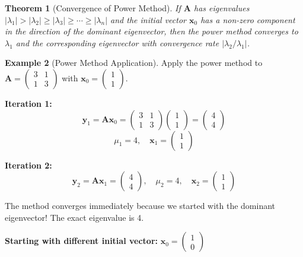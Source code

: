 \documentclass[12pt]{article}
\numberwithin{equation}{section}
\newcommand{\vect}[1]{\boldsymbol{#1}}   %
\newcommand{\mat}[1]{\mathbf{#1}}        %
\theoremstyle{plain}
\newtheorem{theorem}{Theorem}[section]
\theoremstyle{definition}
\newtheorem{example}[theorem]{Example}
\theoremstyle{remark}
\begin{document}
\begin{theorem}[Convergence of Power Method]
If $\mat{A}$ has eigenvalues $|\lambda_1| > |\lambda_2| \geq |\lambda_3| \geq \cdots \geq |\lambda_n|$ and the initial vector $\vect{x}_0$ has a non-zero component in the direction of the dominant eigenvector, then the power method converges to $\lambda_1$ and the corresponding eigenvector with convergence rate $|\lambda_2/\lambda_1|$.
\end{theorem}

\begin{example}[Power Method Application]
Apply the power method to $\mat{A} = \begin{pmatrix} 3 & 1 \\ 1 & 3 \end{pmatrix}$ with $\vect{x}_0 = \begin{pmatrix} 1 \\ 1 \end{pmatrix}$.

\textbf{Iteration 1:}
$$\vect{y}_1 = \mat{A}\vect{x}_0 = \begin{pmatrix} 3 & 1 \\ 1 & 3 \end{pmatrix}\begin{pmatrix} 1 \\ 1 \end{pmatrix} = \begin{pmatrix} 4 \\ 4 \end{pmatrix}$$
$$\mu_1 = 4, \quad \vect{x}_1 = \begin{pmatrix} 1 \\ 1 \end{pmatrix}$$

\textbf{Iteration 2:}
$$\vect{y}_2 = \mat{A}\vect{x}_1 = \begin{pmatrix} 4 \\ 4 \end{pmatrix}, \quad \mu_2 = 4, \quad \vect{x}_2 = \begin{pmatrix} 1 \\ 1 \end{pmatrix}$$

The method converges immediately because we started with the dominant eigenvector! The exact eigenvalue is 4.

\textbf{Starting with different initial vector:} $\vect{x}_0 = \begin{pmatrix} 1 \\ 0 \end{pmatrix}$


\end{example}
\end{document}
